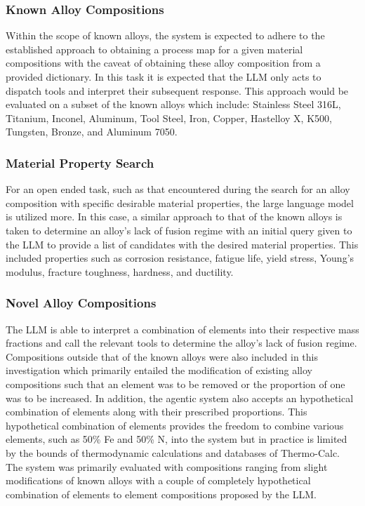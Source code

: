 \subsubsection{Known Alloy Compositions}
Within the scope of known alloys, the system is expected to adhere to the
established approach to obtaining a process map for a given material
compositions with the caveat of obtaining these alloy composition from a
provided dictionary. In this task it is expected that the LLM only acts to
dispatch tools and interpret their subsequent response. This approach would be
evaluated on a subset of the known alloys which include: Stainless Steel 316L,
Titanium, Inconel, Aluminum, Tool Steel, Iron, Copper, Hastelloy X, K500,
Tungsten, Bronze, and Aluminum 7050.

\subsubsection{Material Property Search}
For an open ended task, such as that encountered during the search for an alloy
composition with specific desirable material properties, the large language
model is utilized more. In this case, a similar approach to that of the known
alloys is taken to determine an alloy's lack of fusion regime with an initial query given
to the LLM to provide a list of candidates with the desired material properties.
This included properties such as corrosion resistance, fatigue life, yield
stress, Young's modulus, fracture toughness, hardness, and ductility.

\subsubsection{Novel Alloy Compositions}
The LLM is able to interpret a combination of elements into their respective
mass fractions and call the relevant tools to determine the alloy's lack of
fusion regime. Compositions outside that of the known alloys were also included
in this investigation which primarily entailed the modification of existing
alloy compositions such that an element was to be removed or the proportion of
one was to be increased. In addition, the agentic system also accepts an
hypothetical combination of elements along with their prescribed proportions.
This hypothetical combination of elements provides the freedom to combine
various elements, such as 50\% Fe and 50\% N, into the system but in practice is
limited by the bounds of thermodynamic calculations and databases of
Thermo-Calc. The system was primarily evaluated with compositions ranging from
slight modifications of known alloys with a couple of completely hypothetical
combination of elements to element compositions proposed by the LLM.

